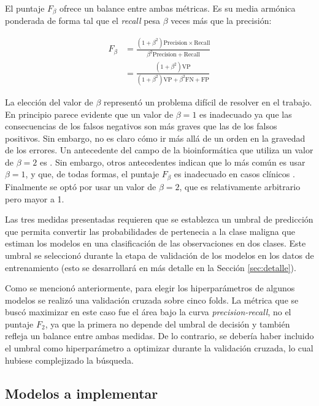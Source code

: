 El puntaje $F_\beta$ ofrece un balance entre ambas métricas. Es su media
armónica ponderada de forma tal que el \textit{recall} pesa $\beta$ veces más
que la precisión:

\begin{equation}
\begin{aligned}
  F_\beta &= \frac{(1 + \beta^2) \text{Precision} \times  \text{Recall}}{\beta^2 \text{Precision} + \text{Recall}} \\
  &= \frac{(1 + \beta^2) \text{VP}}{(1 + \beta^2) \text{VP} + \beta^2 \text{FN} + \text{FP}}
\end{aligned}
\end{equation}

La elección del valor de $\beta$ representó un problema difícil de resolver en
el trabajo. En principio parece evidente que un valor de $\beta = 1$ es
inadecuado ya que las consecuencias de los falsos negativos son más graves que
las de los falsos positivos. Sin embargo, no es claro cómo ir más allá de un
orden en la gravedad de los errores. Un antecedente del campo de la
bioinformática que utiliza un valor de $\beta = 2$ es
\textcite{sanchez-herrero_etal_2024_forecasting}. Sin embargo, otros antecedentes
indican que lo más común es usar $\beta = 1$, y que, de todas formas, el
puntaje $F_\beta$ es inadecuado en casos clínicos
\parencite{assel_vickers_2025_score}. Finalmente se optó por usar un valor de
$\beta = 2$, que es relativamente arbitrario pero mayor a 1.

Las tres medidas presentadas requieren que se establezca un umbral de
predicción que permita convertir las probabilidades de pertenecia a la clase
maligna que estiman los modelos en una clasificación de las observaciones en
dos clases. Este umbral se seleccionó durante la etapa de validación de los
modelos en los datos de entrenamiento (esto se desarrollará en más detalle en
la Sección \ref{sec:detalle}).

Como se mencionó anteriormente, para elegir los hiperparámetros de algunos
modelos se realizó una validación cruzada sobre cinco folds. La métrica que se
buscó maximizar en este caso fue el área bajo la curva
\textit{precision-recall}, no el puntaje $F_2$, ya que la primera no depende
del umbral de decisión y también refleja un balance entre ambas medidas. De lo
contrario, se debería haber incluido el umbral como hiperparámetro a optimizar
durante la validación cruzada, lo cual hubiese complejizado la búsqueda.

\subsection{Modelos a implementar}\label{sec:modelos}

